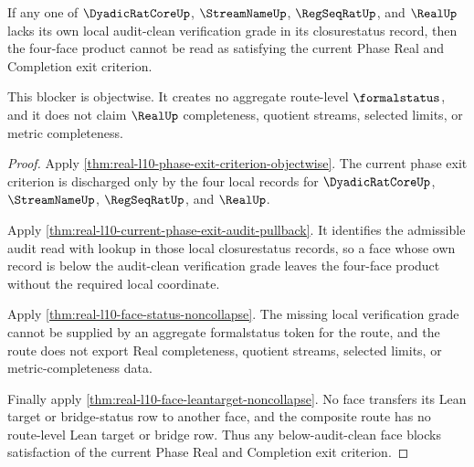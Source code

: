 \begin{theorem}
\label{thm:real-l10-face-audit-minimum-blocker}
If any one of $\DyadicRatCoreUp$, $\StreamNameUp$, $\RegSeqRatUp$, and
$\RealUp$ lacks its own local audit-clean verification grade in its
closurestatus record, then the four-face product cannot be read as satisfying
the current Phase Real and Completion exit criterion.

This blocker is objectwise. It creates no aggregate route-level
$\formalstatus$, and it does not claim $\RealUp$ completeness, quotient
streams, selected limits, or metric completeness.
\end{theorem}
\begin{proof}
Apply \autoref{thm:real-l10-phase-exit-criterion-objectwise}. The current
phase exit criterion is discharged only by the four local records for
$\DyadicRatCoreUp$, $\StreamNameUp$, $\RegSeqRatUp$, and $\RealUp$.

Apply \autoref{thm:real-l10-current-phase-exit-audit-pullback}. It identifies
the admissible audit read with lookup in those local closurestatus records, so
a face whose own record is below the audit-clean verification grade leaves the
four-face product without the required local coordinate.

Apply \autoref{thm:real-l10-face-status-noncollapse}. The missing local
verification grade cannot be supplied by an aggregate formalstatus token for
the route, and the route does not export Real completeness, quotient streams,
selected limits, or metric-completeness data.

Finally apply \autoref{thm:real-l10-face-leantarget-noncollapse}. No face
transfers its Lean target or bridge-status row to another face, and the
composite route has no route-level Lean target or bridge row. Thus any
below-audit-clean face blocks satisfaction of the current Phase Real and
Completion exit criterion.
\end{proof}

